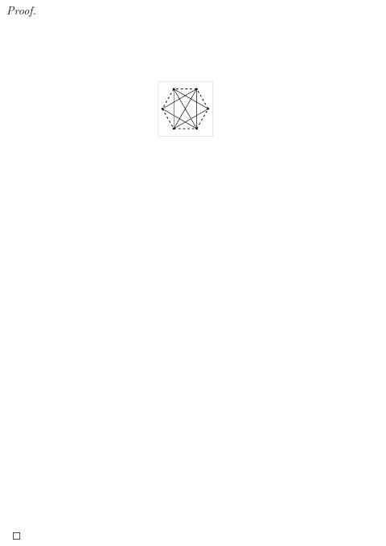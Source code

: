 \begin{proof}
\begin{figure}[t!]
\begin{minipage}[b]{.19\textwidth}
        \includegraphics[width=\textwidth,page=7]{images/polygon_conf}
        \subcaption{~}\label{fig:8_stick}
    \end{minipage}
    \begin{minipage}[b]{.19\textwidth}
        \centering

\end{minipage}
\end{figure}
\end{proof}
